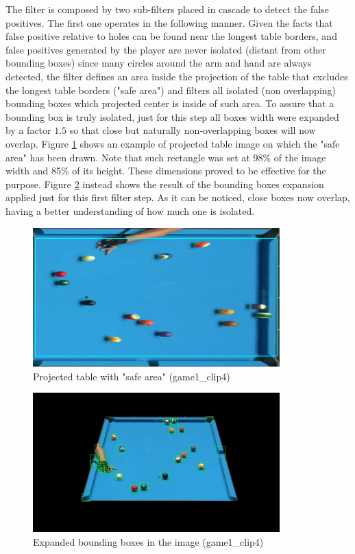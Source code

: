 The filter is composed by two sub-filters placed in cascade to detect the false positives.
The first one operates in the following manner. Given the facts that false positive relative to holes can be found near the longest table
borders, and false positives generated by the player are never isolated (distant from other bounding boxes) since
many circles around the arm and hand are always detected, the filter defines an area inside the projection of the table that excludes
the longest table borders ("safe area") and filters all isolated (non overlapping) bounding boxes which projected center is inside of such area.
To assure that a bounding box is truly isolated, just for this step all boxes width were expanded by a factor $1.5$ so that close but naturally
non-overlapping boxes will now overlap. Figure \ref{fig:safe_area} shows an example of projected table image on which the "safe area" has been drawn.
Note that such rectangle was set at 98\% of the image width and 85\% of its height. These dimensions proved to be effective for the purpose. 
Figure \ref{fig:exp_bboxes} instead shows the result of the bounding boxes expansion applied just for this first filter step. As it can be noticed, close
boxes now overlap, having a better understanding of how much one is isolated.
\begin{figure}[h!]
    \centering
    \includegraphics[width=0.85\textwidth]{imgs/ball_localization/safe_area.jpg}
    \caption{Projected table with "safe area" (game1\_clip4)}
    \label{fig:safe_area}
\end{figure}
\begin{figure}[h!]
    \centering
    \includegraphics[width=0.85\textwidth]{imgs/ball_localization/exp_boxes_filter.jpg}
    \caption{Expanded bounding boxes in the image (game1\_clip4)}
    \label{fig:exp_bboxes}
\end{figure}

